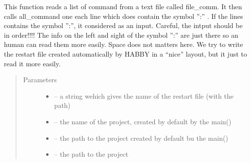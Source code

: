\documentclass[letterpaper,10pt,english]{sphinxmanual}
\begin{document}
\begin{fulllineitems}
\label{\detokenize{index:src.func_for_cmd.habby_restart}}
This function reads a list of command from a text file called file\_comm. It then calls all\_command one each line
which does contain the symbol '':'' . If the lines contains the symbol '':'', it considered as an input.
Careful, the intput should be in order!!!! The info on the left and sight of the symbol '':'' are just there so
an human can read them more easily. Space does not matters here. We try to write the restart file created
automatically by HABBY in a ``nice'' layout, but it just to  read it more easily.
\begin{quote}\begin{description}
\item[{Parameters}] \leavevmode\begin{itemize}
\item {} 
 -- a string wehich gives the name of the restart file (with the path)

\item {} 
 -- the name of the project, created by default by the main()

\item {} 
 -- the path to the project created by default bu the main()

\item {} 
 -- the path to the project

\end{itemize}

\end{description}\end{quote}

\end{fulllineitems}

\end{document}

